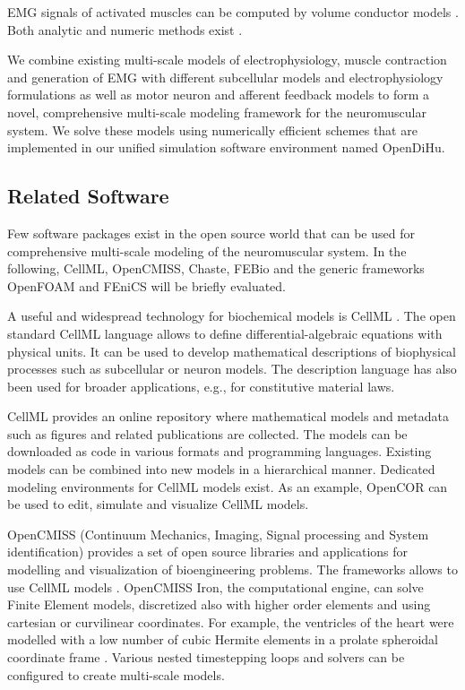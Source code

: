 EMG signals of activated muscles can be computed by volume conductor models \cite{Mesin2013}. Both 
 analytic \cite{Dimitrov1998, Farina2001, Mesin2006} and numeric methods exist \cite{Lowery2002, Mordhorst2015, Mordhorst2017, Klotz2020}.

We combine existing multi-scale models of electrophysiology, muscle contraction and generation of EMG with different subcellular models and electrophysiology formulations as well as motor neuron and afferent feedback models to form a novel, comprehensive multi-scale modeling framework for the neuromuscular system. We solve these models using numerically efficient schemes that are implemented in our unified simulation software environment named OpenDiHu.
 
\subsection{Related Software}
Few software packages exist in the open source world that can be used for comprehensive multi-scale modeling of the neuromuscular system. In the following, CellML, OpenCMISS, Chaste, FEBio and the generic frameworks OpenFOAM and FEniCS will be briefly evaluated.

A useful and widespread technology for biochemical models is CellML \cite{Cellml2003,Lloyd2004}. The open standard CellML language allows to define differential-algebraic equations with physical units. It can be used to develop mathematical descriptions of biophysical processes such as subcellular or neuron models. The description language has also been used for broader applications, e.g., for constitutive material laws. 

CellML provides an online repository where mathematical models and metadata such as figures and related publications are collected. The models can be downloaded as code in various formats and programming languages. Existing models can be combined into new models in a hierarchical manner. Dedicated modeling environments for CellML models exist. As an example, OpenCOR \cite{OpenCOR2015} can be used to edit, simulate and visualize CellML models.

OpenCMISS (Continuum Mechanics, Imaging, Signal processing and System identification) \cite{Bradley2011} provides a set of open source libraries and applications for modelling and visualization of bioengineering problems. The frameworks allows to use CellML models \cite{Nickerson2014}.
OpenCMISS Iron, the computational engine, can solve Finite Element models, discretized also with higher order elements and using cartesian or curvilinear coordinates. For example, the ventricles of the heart were modelled with a low number of cubic Hermite elements in a prolate spheroidal coordinate frame \cite{smith2004multiscale}.
Various nested timestepping loops and solvers can be configured to create multi-scale models. 

